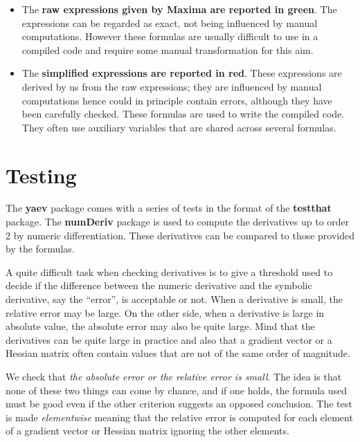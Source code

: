 \documentclass[11pt]{article}\usepackage[]{graphicx}\usepackage[]{xcolor}
\begin{document}
\begin{itemize}
\item The {\color{MonVertF} \bf raw expressions given by Maxima are
    reported in green}. The expressions can be regarded as exact, not
  being influenced by manual computations. However these formulas are
  usually difficult to use in a compiled code and require some manual
  transformation for this aim.

\item The {\color{red} \bf simplified expressions are reported in
    red}.  These expressions are derived by us from the raw
  expressions; they are influenced by manual computations hence could
  in principle contain errors, although they have been carefully
  checked. These formulas are used to write the compiled code.  They
  often use auxiliary variables that are shared across several
  formulas.
  
\end{itemize}

\section{Testing}

The \textbf{yaev} package comes with a series of tests in the format
of the \textbf{testthat} package. The \textbf{numDeriv} package is
used to compute the derivatives up to order 2 by numeric
differentiation. These derivatives can be compared to those provided
by the formulas.

A quite difficult task when checking derivatives is to give a
threshold used to decide if the difference between the numeric
derivative and the symbolic derivative, say the ``error'', is
acceptable or not. When a derivative is small, the relative error may
be large.  On the other side, when a derivative is large in absolute
value, the absolute error may also be quite large.  Mind that the
derivatives can be quite large in practice and also that a gradient
vector or a Hessian matrix often contain values that are not of the
same order of magnitude.

We check that \textit{the absolute error or the relative error is
  small}. The idea is that none of these two things can come by
chance, and if one holds, the formula used must be good even if the
other criterion suggests an opposed conclusion. The test is made
\textit{elementwise} meaning that the relative error is computed for
each element of a gradient vector or Hessian matrix ignoring the other
elements.
\end{document}

